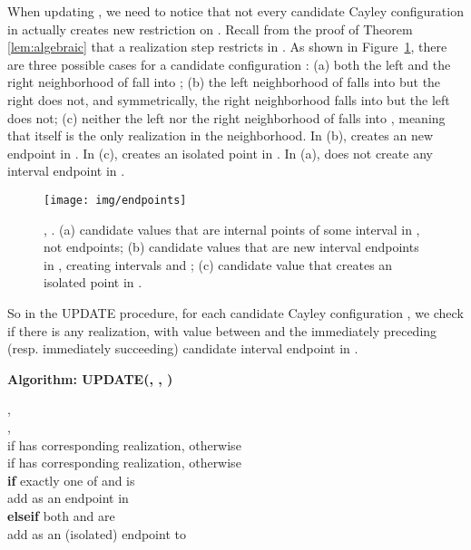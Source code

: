 \documentclass[secthm,amsthm,english]{article}
\theoremstyle{definition}
\theoremstyle{remark}
\begin{document}
When updating , we need to notice that 
not every candidate Cayley configuration  in 
actually creates new restriction on .
Recall from the proof of Theorem \ref{lem:algebraic} that
a realization step 
restricts  in . 
As shown in Figure~\ref{F:endpoints}, there are three possible cases for a candidate configuration : 
(a) both the left and the right neighborhood of  fall into ; 
(b) the left neighborhood of  falls into  but the right does not, and symmetrically,
the right neighborhood falls into  but the left does not;
(c) neither the left nor the right neighborhood of  falls into , meaning that  itself is the only realization in the neighborhood. 
In (b),  creates an new endpoint in . 
In (c),  creates an isolated point in . 
In (a),  does not create any interval endpoint in . 



\begin{figure}[h]
	 
	 
	  
	
	 
	
	\begin{centering}
	\texttt{[image: img/endpoints]} 
	\par\end{centering}
	
	\caption{, .
	(a) candidate  values  that are internal points of some interval in , not endpoints;
	(b) candidate  values  that are new interval endpoints
	in , creating intervals  and ; 
	(c) candidate  value  that creates an isolated point in . }


\label{F:endpoints} 
\end{figure}


So in the UPDATE procedure, 
for each candidate Cayley configuration , 
we check if there is any realization, with  value between 
and the immediately preceding (resp. immediately succeeding) candidate interval endpoint 
in . 



\noindent \textbf{Algorithm: UPDATE(, , )} 

\indent , {   }   \\ \indent , {   }  \\ \indent  if  has corresponding realization,  otherwise \\
\indent  if  has corresponding realization,  otherwise \\
\indent \textbf{if} exactly one of  and  is   \\
	\indent \indent add  as an endpoint in  \\
\indent \textbf{elseif} both  and  are  \\
	\indent \indent add  as an (isolated) endpoint to  
\end{document}
